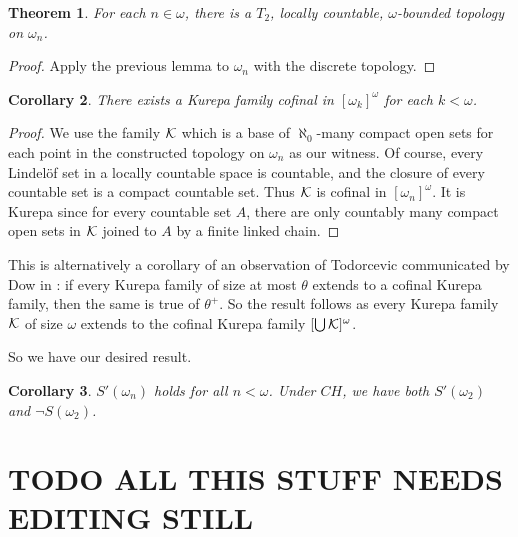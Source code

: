 \documentclass{amsart}
\theoremstyle{plain}
\newtheorem{theorem}{Theorem}
\newtheorem{corollary}[theorem]{Corollary}
\theoremstyle{definition}
\theoremstyle{remark}
\theoremstyle{plain}
\theoremstyle{definition}
\theoremstyle{remark}
\begin{document}
  \begin{theorem}
    For each $n\in \omega$, there is a \(T_2\), locally countable,
    $\omega$-bounded topology on $\omega_n$.
  \end{theorem}

  \begin{proof}
    Apply the previous lemma to \(\omega_n\) with the discrete topology.
  \end{proof}

  \begin{corollary}
    There exists a Kurepa family cofinal in \([\omega_k]^\omega\)
    for each \(k<\omega\).
  \end{corollary}

  \begin{proof}
    We use the family \(\mathcal{K}\) which is a base of \(\aleph_0\)-many compact
    open sets for each point in the constructed topology on
    \(\omega_n\) as our witness. Of course, every Lindel\"of set in
    a locally countable space is countable, and the closure of every
    countable set is a compact countable set. Thus \(\mathcal{K}\)
    is cofinal in \([\omega_n]^\omega\).
    It is Kurepa since for every countable set \(A\), there are only countably
    many compact open sets in \(\mathcal{K}\)
    joined to \(A\) by a finite linked chain.
  \end{proof}

  This is alternatively a corollary of an observation of Todorcevic
  communicated by Dow in \cite{MR1229125}:
  if every Kurepa family of size at most \(\theta\)
  extends to a cofinal Kurepa family, then the same is true of \(\theta^+\).
  So the result follows as
  every Kurepa family \(\mathcal{K}\) of size \(\omega\) extends to
  the cofinal Kurepa family \([\bigcup\mathcal{K}]^\omega\).

  So we have our desired result.

  \begin{corollary}
    \(S'(\omega_n)\) holds for all \(n<\omega\). Under \(CH\), we have
    both \(S'(\omega_2)\) and \(\neg S(\omega_2)\).
  \end{corollary}









  \newpage

  \section{TODO ALL THIS STUFF NEEDS EDITING STILL}
\end{document}
